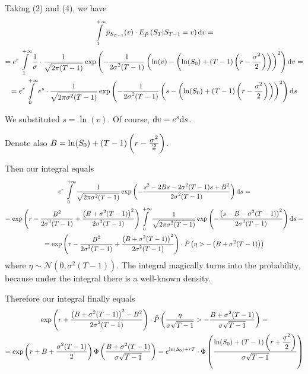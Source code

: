 \documentclass[pdftex,12pt,a4paper]{article}
\begin{document}
Taking (2) and (4), we have 
\begin{multline}
 \int\limits_{1}^{+\infty}\tilde{p}_{S_{T-1}}(v)\cdot E_{\tilde{P}}\left(S_{T} | S_{T-1} = v\right)\mathrm{d}v =\\
 = e^{r}\int\limits_{1}^{+\infty}\frac{\displaystyle 1}{\displaystyle \sigma}\cdot \frac{\displaystyle 1}{\displaystyle \sqrt{2\pi (T-1)}}\exp\left(-\frac{\displaystyle 1}{\displaystyle 2\sigma^{2}(T-1)}\left(\ln(v) - \left(\ln(S_{0}) + (T-1)\left(r - \frac{\displaystyle \sigma^{2}}{\displaystyle 2}\right)\right)\right)^{2}\right)\mathrm{d}v = \\
 = e^{r}\int\limits_{0}^{+\infty}e^{s}\cdot \frac{\displaystyle 1}{\displaystyle \sqrt{2\pi\sigma^{2} (T-1)}}\exp\left(-\frac{\displaystyle 1}{\displaystyle 2\sigma^{2}(T-1)}\left(s - \left(\ln(S_{0}) + (T-1)\left(r - \frac{\displaystyle \sigma^{2}}{\displaystyle 2}\right)\right)\right)^{2}\right)\mathrm{d}s
\end{multline}

We substituted $s = \ln(v)$. Of course, $\mathrm{d}v = e^{s}\mathrm{d}s$.\par
Denote also $B = \ln(S_{0}) + (T-1)\left(r - \frac{\displaystyle \sigma^{2}}{\displaystyle 2}\right)$.\par
Then our integral equals
\begin{multline}
e^{r}\int\limits_{0}^{+\infty} \frac{\displaystyle 1}{\displaystyle \sqrt{2\pi\sigma^{2} (T-1)}}\exp\left(-\frac{\displaystyle s^{2} - 2Bs - 2\sigma^{2}(T-1)s + B^{2}}{\displaystyle 2\sigma^{2}(T-1)}\right)\mathrm{d}s = \\
= \exp\left(r - \frac{\displaystyle B^{2}}{\displaystyle 2\sigma^{2}(T-1)} + \frac{\displaystyle \left(B + \sigma^{2}(T-1)\right)^{2}}{\displaystyle 2\sigma^{2}(T-1)}\right)\int\limits_{0}^{+\infty} \frac{\displaystyle 1}{\displaystyle \sqrt{2\pi\sigma^{2} (T-1)}}\exp\left(-\frac{\displaystyle \left(s - B - \sigma^{2}(T-1)\right)^{2}}{\displaystyle 2\sigma^{2}(T-1)}\right)\mathrm{d}s = \\
= \exp\left(r - \frac{\displaystyle B^{2}}{\displaystyle 2\sigma^{2}(T-1)} + \frac{\displaystyle \left(B + \sigma^{2}(T-1)\right)^{2}}{\displaystyle 2\sigma^{2}(T-1)}\right) \cdot \tilde{P}\left(\eta > -\left(B + \sigma^{2}(T-1)\right)\right)
\end{multline}
where $\eta \sim \mathcal{N}(0, \sigma^{2}(T-1))$. The integral magically turns into the probability, because under the integral there is a well-known density.


Therefore our integral finally equals
\begin{multline}
 \exp\left(r + \frac{\displaystyle \left(B + \sigma^{2}(T-1)\right)^{2} - B^{2}}{\displaystyle 2\sigma^{2}(T-1)}\right)\cdot \tilde{P}\left(\frac{\displaystyle \eta}{\displaystyle \sigma\sqrt{T-1}} > -\frac{\displaystyle B + \sigma^{2}(T-1)}{\displaystyle \sigma\sqrt{T-1}}\right) = \\
=
\exp\left(r + B + \frac{\displaystyle \sigma^{2}(T-1)}{\displaystyle 2}\right)\Phi\left(\frac{\displaystyle B + \sigma^{2}(T-1)}{\displaystyle \sigma\sqrt{T-1}}\right) = e^{\ln(S_{0}) + rT}\cdot\Phi\left(\frac{\displaystyle \ln(S_{0}) + (T-1)\left(r + \frac{\displaystyle \sigma^{2}}{\displaystyle 2}\right)}{\displaystyle \sigma\sqrt{T-1}}\right)
\end{multline}
\end{document}
